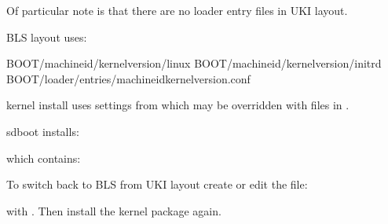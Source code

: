 \documentclass[letterpaper,11pt,english]{sphinxmanual}
\begin{document}
\sphinxAtStartPar
Of particular note is that there are no loader entry files in UKI layout.

\sphinxAtStartPar
BLS layout uses:

\begin{sphinxVerbatim}[commandchars=\\\{\}]
\PYGZdl{}BOOT/\PYGZlt{}machine\PYGZhy{}id\PYGZgt{}/\PYGZlt{}kernel\PYGZhy{}version\PYGZgt{}/linux
\PYGZdl{}BOOT/\PYGZlt{}machine\PYGZhy{}id\PYGZgt{}/\PYGZlt{}kernel\PYGZhy{}version\PYGZgt{}/initrd
\PYGZdl{}BOOT/loader/entries/\PYGZlt{}\PYGZlt{}machine\PYGZhy{}id\PYGZgt{}\PYGZhy{}\PYGZlt{}kernel\PYGZhy{}version\PYGZgt{}.conf
\end{sphinxVerbatim}

\sphinxAtStartPar
kernel install uses settings from  which may be over\sphinxhyphen{}ridden
with files in .

\sphinxAtStartPar
sd\sphinxhyphen{}boot installs:

\begin{sphinxVerbatim}[commandchars=\\\{\}]
\end{sphinxVerbatim}

\sphinxAtStartPar
which contains:

\begin{sphinxVerbatim}[commandchars=\\\{\}]
\end{sphinxVerbatim}

\sphinxAtStartPar
To switch back to BLS from UKI layout create or edit the file:

\begin{sphinxVerbatim}[commandchars=\\\{\}]
\end{sphinxVerbatim}

\sphinxAtStartPar
with .
Then install the kernel package again.
\end{document}
